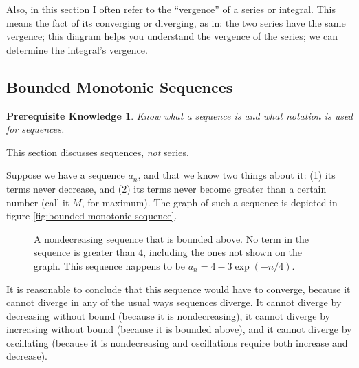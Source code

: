 \documentclass{myarticle}
\newcommand\danger{{
    \fontencoding{U}\fontfamily{futs}\selectfont\char 66\relax}}
\theoremstyle{nospace}
\newtheorem*{oldprereq}{Prerequisite Knowledge}
\newenvironment{prereq}
{\begin{mdframed}\begin{oldprereq}}
    {\end{oldprereq}\end{mdframed}}
\newtheorem{old series theorem}{Theorem}
\newenvironment{series theorem}
{\begin{mdframed}\begin{old series theorem}}
    {\end{old series theorem}\end{mdframed}}
\begin{document}
Also, in this section I often refer to the ``vergence'' of a series or
integral. This means the fact of its converging or diverging, as in:
the two series have the same vergence; this diagram helps you
understand the vergence of the series; we can determine the integral's
vergence.

\subsection{Bounded Monotonic Sequences}
\label{sec:bounded monotonic sequences}

\begin{prereq}
  Know what a sequence is and what notation is used for sequences.
\end{prereq}

\begin{mdframed}
  \centering
  \danger

  This section discusses sequences, \emph{not} series.
\end{mdframed}

Suppose we have a sequence $a_n$, and that we know two things about
it: (1) its terms never decrease, and (2) its terms never become
greater than a certain number (call it $M$, for maximum). The graph of
such a sequence is depicted in figure \ref{fig:bounded monotonic
  sequence}.

\begin{figure}[htb!] \centering
  \caption{A nondecreasing sequence that is bounded above. No term in
    the sequence is greater than $4$, including the ones not shown on
    the graph. This sequence happens to be $a_n = 4 - 3\exp(-n/4)$.}
  \label{fig:bounded monotonic sequence}
\end{figure}

It is reasonable to conclude that this sequence would have to
converge, because it cannot diverge in any of the usual ways sequences
diverge. It cannot diverge by decreasing without bound (because it is
nondecreasing), it cannot diverge by increasing without bound (because
it is bounded above), and it cannot diverge by oscillating (because it
is nondecreasing and oscillations require both increase and decrease).
\end{document}
